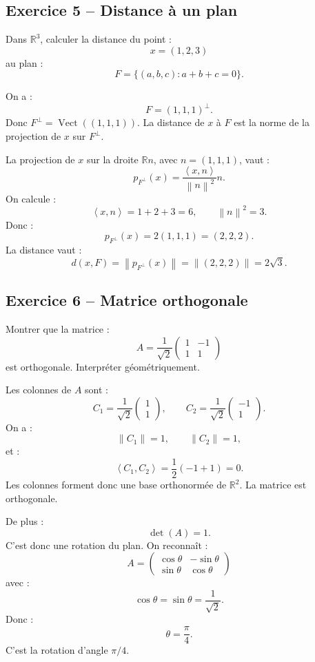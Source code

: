 \documentclass[11pt,a4paper]{article}
\newcommand{\R}{\mathbb R}
\newcommand{\Vect}{\operatorname{Vect}}
\newcommand{\norme}[1]{\left\lVert #1\right\rVert}
\newcommand{\scal}[2]{\left\langle #1,#2\right\rangle}
\begin{document}
\subsection*{Exercice 5 -- Distance à un plan}

\begin{exercicebox}
Dans \(\R^3\), calculer la distance du point :
\[
x=(1,2,3)
\]
au plan :
\[
F=\{(a,b,c):a+b+c=0\}.
\]
\end{exercicebox}

\begin{correctionbox}
On a :
\[
F=(1,1,1)^\perp.
\]
Donc \(F^\perp=\Vect((1,1,1))\).  
La distance de \(x\) à \(F\) est la norme de la projection de \(x\) sur \(F^\perp\).

La projection de \(x\) sur la droite \(\R n\), avec \(n=(1,1,1)\), vaut :
\[
p_{F^\perp}(x)=\frac{\scal{x}{n}}{\norme{n}^2}n.
\]
On calcule :
\[
\scal{x}{n}=1+2+3=6,
\qquad
\norme{n}^2=3.
\]
Donc :
\[
p_{F^\perp}(x)=2(1,1,1)=(2,2,2).
\]
La distance vaut :
\[
d(x,F)=\norme{p_{F^\perp}(x)}=\norme{(2,2,2)}=2\sqrt3.
\]
\end{correctionbox}

\subsection*{Exercice 6 -- Matrice orthogonale}

\begin{exercicebox}
Montrer que la matrice :
\[
A=
\frac{1}{\sqrt2}
\begin{pmatrix}
1&-1\\
1&1
\end{pmatrix}
\]
est orthogonale. Interpréter géométriquement.
\end{exercicebox}

\begin{correctionbox}
Les colonnes de \(A\) sont :
\[
C_1=\frac1{\sqrt2}\begin{pmatrix}1\\1\end{pmatrix},
\qquad
C_2=\frac1{\sqrt2}\begin{pmatrix}-1\\1\end{pmatrix}.
\]
On a :
\[
\norme{C_1}=1,
\qquad
\norme{C_2}=1,
\]
et :
\[
\scal{C_1}{C_2}
=
\frac12(-1+1)=0.
\]
Les colonnes forment donc une base orthonormée de \(\R^2\).  
La matrice est orthogonale.

De plus :
\[
\det(A)=1.
\]
C'est donc une rotation du plan.  
On reconnaît :
\[
A=
\begin{pmatrix}
\cos\theta&-\sin\theta\\
\sin\theta&\cos\theta
\end{pmatrix}
\]
avec :
\[
\cos\theta=\sin\theta=\frac1{\sqrt2}.
\]
Donc :
\[
\theta=\frac\pi4.
\]
C'est la rotation d'angle \(\pi/4\).
\end{correctionbox}
\end{document}
